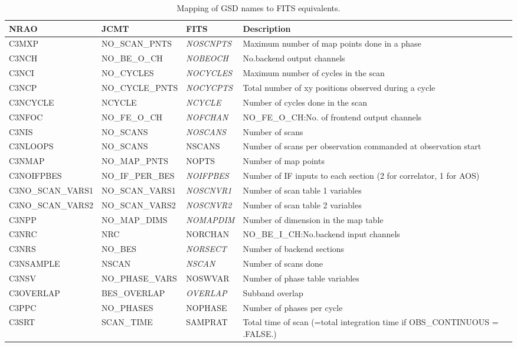 \begin{sidewaystable*}
\caption{Mapping of GSD names to FITS equivalents.}
\begin{center}
\small
\begin{tabular}{llll}
\hline
NRAO & JCMT & FITS & Description\\ \hline

C3MXP & NO\_SCAN\_PNTS & \emph{NOSCNPTS} & Maximum number of map points done in a phase\\
C3NCH & NO\_BE\_O\_CH & \emph{NOBEOCH} & No.backend output channels\\
C3NCI & NO\_CYCLES & \emph{NOCYCLES} & Maximum number of cycles in the scan\\
C3NCP & NO\_CYCLE\_PNTS & \emph{NOCYCPTS} & Total number of xy positions observed during a cycle\\
C3NCYCLE & NCYCLE & \emph{NCYCLE} & Number of cycles done in the scan\\
C3NFOC & NO\_FE\_O\_CH & \emph{NOFCHAN} & NO\_FE\_O\_CH:No. of frontend output channels\\
C3NIS & NO\_SCANS & \emph{NOSCANS} & Number of scans\\
C3NLOOPS & NO\_SCANS & NSCANS & Number of scans per observation commanded at observation start\\
C3NMAP & NO\_MAP\_PNTS & NOPTS & Number of map points\\
C3NOIFPBES & NO\_IF\_PER\_BES & \emph{NOIFPBES} & Number of IF inputs to each section (2 for correlator, 1 for AOS)\\
C3NO\_SCAN\_VARS1 & NO\_SCAN\_VARS1 & \emph{NOSCNVR1} & Number of scan table 1 variables\\
C3NO\_SCAN\_VARS2 & NO\_SCAN\_VARS2 & \emph{NOSCNVR2} & Number of scan table 2 variables\\
C3NPP & NO\_MAP\_DIMS & \emph{NOMAPDIM} & Number of dimension in the map table\\
C3NRC & NRC & NORCHAN & NO\_BE\_I\_CH:No.backend input channels\\
C3NRS & NO\_BES & \emph{NORSECT} & Number of backend sections\\
C3NSAMPLE & NSCAN & \emph{NSCAN} & Number of scans done\\
C3NSV & NO\_PHASE\_VARS & NOSWVAR & Number of phase table variables\\
C3OVERLAP & BES\_OVERLAP & \emph{OVERLAP} & Subband overlap\\
C3PPC & NO\_PHASES & NOPHASE & Number of phases per cycle\\
C3SRT & SCAN\_TIME & SAMPRAT & Total time of scan (=total integration time if OBS\_CONTINUOUS = .FALSE.)\\

\end{tabular}
\end{center}
\end{sidewaystable*}
